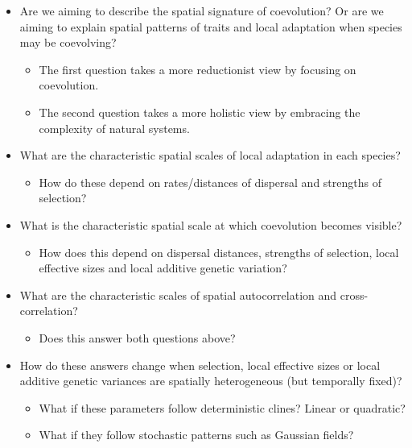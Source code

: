 \documentclass{article}
\begin{document}
\begin{itemize}
\tightlist
\item
  Are we aiming to describe the spatial signature of coevolution? Or are
  we aiming to explain spatial patterns of traits and local adaptation
  when species may be coevolving?

  \begin{itemize}
  \tightlist
  \item
    The first question takes a more reductionist view by focusing on
    coevolution.
  \item
    The second question takes a more holistic view by embracing the
    complexity of natural systems.
  \end{itemize}
\item
  What are the characteristic spatial scales of local adaptation in each
  species?

  \begin{itemize}
  \tightlist
  \item
    How do these depend on rates/distances of dispersal and strengths of
    selection?
  \end{itemize}
\item
  What is the characteristic spatial scale at which coevolution becomes
  visible?

  \begin{itemize}
  \tightlist
  \item
    How does this depend on dispersal distances, strengths of selection,
    local effective sizes and local additive genetic variation?
  \end{itemize}
\item
  What are the characteristic scales of spatial autocorrelation and
  cross-correlation?

  \begin{itemize}
  \tightlist
  \item
    Does this answer both questions above?
  \end{itemize}
\item
  How do these answers change when selection, local effective sizes or
  local additive genetic variances are spatially heterogeneous (but
  temporally fixed)?

  \begin{itemize}
  \tightlist
  \item
    What if these parameters follow deterministic clines? Linear or
    quadratic?
  \item
    What if they follow stochastic patterns such as Gaussian fields?


\end{itemize}
\end{itemize}
\end{document}

